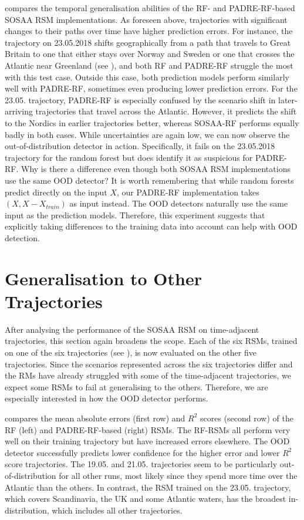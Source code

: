 \noindent {} compares the temporal generalisation abilities of the RF- and PADRE-RF-based SOSAA RSM implementations. As foreseen above, trajectories with significant changes to their paths over time have higher prediction errors. For instance, the trajectory on 23.05.2018 shifts geographically from a path that travels to Great Britain to one that either stays over Norway and Sweden or one that crosses the Atlantic near Greenland (see ), and both RF and PADRE-RF struggle the most with this test case. Outside this case, both prediction models perform similarly well with PADRE-RF, sometimes even producing lower prediction errors. For the 23.05. trajectory, PADRE-RF is especially confused by the scenario shift in later-arriving trajectories that travel across the Atlantic. However, it predicts the shift to the Nordics in earlier trajectories better, whereas SOSAA-RF performs equally badly in both cases. While uncertainties are again low, we can now observe the out-of-distribution detector in action. Specifically, it fails on the 23.05.2018 trajectory for the random forest but does identify it as suspicious for PADRE-RF. Why is there a difference even though both SOSAA RSM implementations use the same OOD detector? It is worth remembering that while random forests predict directly on the input $X$, our PADRE-RF implementation takes $(X, X-X_{train})$ as input instead. The OOD detectors naturally use the same input as the prediction models. Therefore, this experiment suggests that explicitly taking differences to the training data into account can help with OOD detection.

\section{Generalisation to Other Trajectories} \label{txt:trajectory-generalisation}

After analysing the performance of the SOSAA RSM on time-adjacent trajectories, this section again broadens the scope. Each of the six RSMs, trained on one of the six trajectories (see ), is now evaluated on the other five trajectories. Since the scenarios represented across the six trajectories differ and the RMs have already struggled with some of the time-adjacent trajectories, we expect some RSMs to fail at generalising to the others. Therefore, we are especially interested in how the OOD detector performs.

 compares the mean absolute errors (first row) and $R^2$ scores (second row) of the RF (left) and PADRE-RF-based (right) RSMs. The RF-RSMs all perform very well on their training trajectory but have increased errors elsewhere. The OOD detector successfully predicts lower confidence for the higher error and lower $R^2$ score trajectories. The 19.05. and 21.05. trajectories seem to be particularly out-of-distribution for all other runs, most likely since they spend more time over the Atlantic than the others. In contrast, the RSM trained on the 23.05. trajectory, which covers Scandinavia, the UK and some Atlantic waters, has the broadest in-distribution, which includes all other trajectories.

